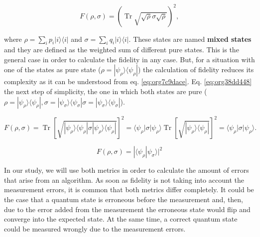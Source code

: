 \begin{equation}
\label{eq:org462ac50}
{\displaystyle F(\rho ,\sigma )=\left(\operatorname {Tr} {\sqrt {{\sqrt {\rho }}\sigma {\sqrt {\rho }}}}\right)^{2},}
\end{equation}

where \(\rho =\sum _{i}p_{i}|i\rangle \langle i|\) and \(\sigma =\sum _{i}q_{i}|i\rangle \langle i|\).
These states are named \textbf{mixed states} and they are defined as the weighted sum of different pure states.
This is the general case in order to calculate the fidelity in any case.
But, for a situation with one of the states as pure state (\({\displaystyle \rho =|\psi _{\rho }\rangle \!\langle \psi _{\rho }|}\)) the calculation of fidelity reduces its complexity as it can be understood from eq. \ref{eq:org7c9dace}.
Eq. \ref{eq:org38dd448} the next step of simplicity, the one in which both states are pure (\({\displaystyle \rho =|\psi _{\rho }\rangle \!\langle \psi _{\rho }|}, {\displaystyle \sigma =|\psi _{\sigma }\rangle \!\langle \psi _{\sigma }|} {\displaystyle \sigma =|\psi _{\sigma }\rangle \!\langle \psi _{\sigma }|}\)).


\begin{equation}
\label{eq:org7c9dace}
{\displaystyle F(\rho ,\sigma )=\operatorname {Tr} \left[{\sqrt {|\psi _{\rho }\rangle \langle \psi _{\rho }|\sigma |\psi _{\rho }\rangle \langle \psi _{\rho }|}}\right]^{2}=\langle \psi _{\rho }|\sigma |\psi _{\rho }\rangle \operatorname {Tr} \left[{\sqrt {|\psi _{\rho }\rangle \langle \psi _{\rho }|}}\right]^{2}=\langle \psi _{\rho }|\sigma |\psi _{\rho }\rangle .}
\end{equation}

\begin{equation}
\label{eq:org38dd448}
{\displaystyle F(\rho ,\sigma )=|\langle \psi _{\rho }|\psi _{\sigma }\rangle |^{2}}
\end{equation}




In our study, we will use both metrics in order to calculate the amount of errors that arise from an algorithm.
As soon as fidelity is not taking into account the measurement errors, it is common that both metrics differ completely.
It could be the case that a quantum state is erroneous before the measurement and, then, due to the error added from the measurement the erroneous state would flip and converge into the expected state.
At the same time, a correct quantum state could be measured wrongly due to the measurement errors.

